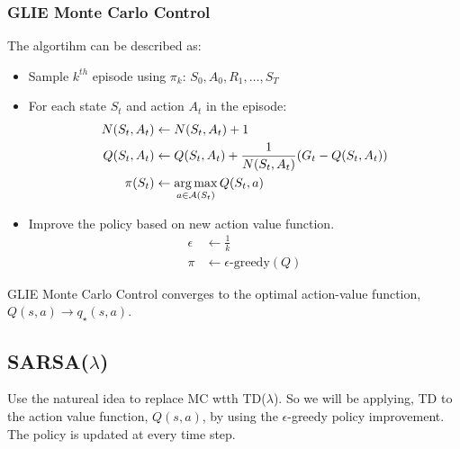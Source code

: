 \subsubsection{GLIE Monte Carlo Control}
The algortihm can be described as:
\begin{itemize}
  \item Sample \(k^{th}\) episode using \(\pi_k\): \(S_0, A_0, R_1, \dots, S_{T}\)
  \item For each state \(S_t\) and action \(A_t\) in the episode:
  \[
    \begin{aligned}
      N(S_t, A_t) &\leftarrow N(S_t, A_t) + 1 \\
      Q(S_t, A_t) &\leftarrow Q(S_t, A_t) + \frac{1}{N(S_t, A_t)} (G_t - Q(S_t, A_t)) \\
      \pi(S_t) &\leftarrow \operatorname*{arg\,max}_{a \in \mathcal{A}(S_t)} Q(S_t, a)  
    \end{aligned}
  \]
  \item Improve the policy based on new action value function.
  \[
    \begin{aligned}
      \epsilon &\leftarrow \frac{1}{k} \\
      \pi &\leftarrow \epsilon\text{-greedy}(Q)
    \end{aligned}
  \]
\end{itemize}
\begin{theorem}
  GLIE Monte Carlo Control converges to the optimal action-value function, \(Q(s,a) \to
  q_\star(s,a)\).
\end{theorem}

\subsection{SARSA(\(\lambda \))}
Use the natureal idea to replace MC wtth TD(\(\lambda\)). So we will be applying,
TD to the action value function, \(Q(s,a)\), by using the \(\epsilon\)-greedy policy
improvement. The policy is updated at every time step.

